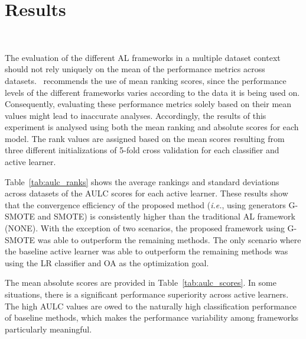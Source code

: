 \documentclass[parskip=full]{scrartcl}
\begin{document}
\section{Results}~\label{sec:results}

The evaluation of the different AL frameworks in a multiple dataset context
should not rely uniquely on the mean of the performance metrics across
datasets.~\cite{demvsar2006} recommends the use of mean ranking scores, since
the performance levels of the different frameworks varies according to the
data it is being used on. Consequently, evaluating these performance metrics
solely based on their mean values might lead to inaccurate analyses.
Accordingly, the results of this experiment is analysed using both the mean
ranking and absolute scores for each model.  The rank values are assigned
based on the mean scores resulting from three different initializations of
5-fold cross validation for each classifier and active learner.

Table~\ref{tab:aulc_ranks} shows the average rankings and standard deviations
across datasets of the AULC scores for each active learner. These results show
that the convergence efficiency of the proposed method (\textit{i.e.}, using
generators G-SMOTE and SMOTE) is consistently higher than the traditional AL
framework (NONE). With the exception of two scenarios, the proposed framework
using G-SMOTE was able to outperform the remaining methods. The only scenario
where the baseline active learner was able to outperform the remaining methods
was using the LR classifier and OA as the optimization goal. 


The mean absolute scores are provided in Table~\ref{tab:aulc_scores}. In some
situations, there is a significant performance superiority across active
learners. The high AULC values are owed to the naturally high classification
performance of baseline methods, which makes the performance variability among
frameworks particularly meaningful. 

\end{document}
